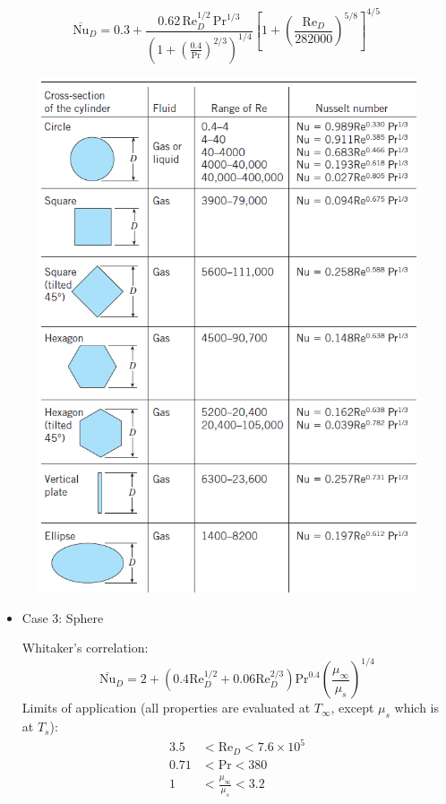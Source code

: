 \begin{equation*}
            \overline{\text{Nu}}_D = 0.3 + \frac{0.62\, \text{Re}_D^{1/2}\, \text{Pr}^{1/3}}{\left(1+(\frac{0.4}{\text{Pr}})^{2/3}\right)^{1/4}} \left[1+\left(\frac{\text{Re}_D}{282000}\right)^{5/8}\right]^{4/5}
        \end{equation*}
\begin{figure}[H]
    \centering
    \includegraphics[width=1.0\linewidth]{images/Nusselt_Number_Cylinder.png}
\end{figure}

\begin{itemize}
    \item Case 3: \color{red} Sphere \color{black}
    
    Whitaker's correlation:
    \begin{equation*}
        \overline{\text{Nu}}_D = 2 + \left(0.4\text{Re}_{D}^{1/2}+0.06\text{Re}_{D}^{2/3}\right)\text{Pr}^{0.4}\left(\frac{\mu_{\infty}}{\mu_s}\right)^{1/4}
    \end{equation*}
    Limits of application (all properties are evaluated at $T_{\infty}$, except $\mu_s$ which is at $T_s$):
    \begin{align*}
        3.5 &< \text{Re}_D < 7.6 \times 10^5 \\
        0.71 &< \text{Pr} < 380 \\
        1 &< \frac{\mu_{\infty}}{\mu_s} < 3.2
    \end{align*}
\end{itemize}

